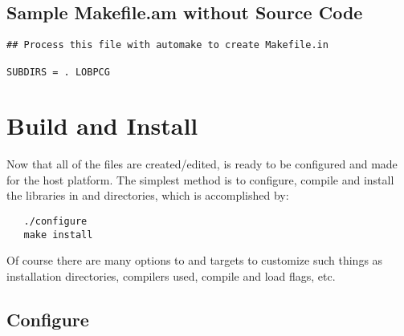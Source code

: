 \subsection{Sample Makefile.am without Source Code}
\label{Sample Makefile.am without Source Code}

\begin{verbatim}
## Process this file with automake to create Makefile.in

SUBDIRS = . LOBPCG

\end{verbatim}

\section{Build and Install}
\label{Build and Install}


Now that all of the files are created/edited, \hypre{} is ready to be configured
and made for the host platform.  The simplest method is to configure, compile and
install the libraries in  and  directories, which is
accomplished by:
\begin{verbatim}
   ./configure
   make install
\end{verbatim}

Of course there are many options to  and  targets to 
customize such things as installation directories, compilers used, compile and
load flags, etc.  

\subsection{Configure}
\label{Configure}


